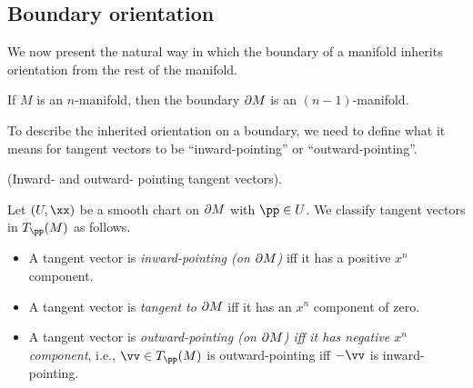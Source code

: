 \subsection*{Boundary orientation}

We now present the natural way in which the boundary of a manifold inherits orientation from the rest of the manifold.

\begin{lemma}
    If $M$ is an $n$-manifold, then the boundary $\partial M$ is an $(n - 1)$-manifold. %
\end{lemma}

To describe the inherited orientation on a boundary, we need to define what it means for tangent vectors to be ``inward-pointing'' or ``outward-pointing''.

\begin{defn}
     (Inward- and outward- pointing tangent vectors).
    
    Let $(U, \xx)$ be a smooth chart on $\partial M$ with $\pp \in U$. We classify tangent vectors in $T_\pp(M)$ as follows.
    
    \begin{itemize}
        \item A tangent vector is \textit{inward-pointing (on $\partial M$)} iff it has a positive $x^n$ component.
        \item A tangent vector is \textit{tangent to $\partial M$} iff it has an $x^n$ component of zero.
        \item A tangent vector is \textit{outward-pointing (on $\partial M$) iff it has negative $x^n$ component}, i.e., $\vv \in T_\pp(M)$ is outward-pointing iff $-\vv$ is inward-pointing.
    \end{itemize}
\end{defn}

    

